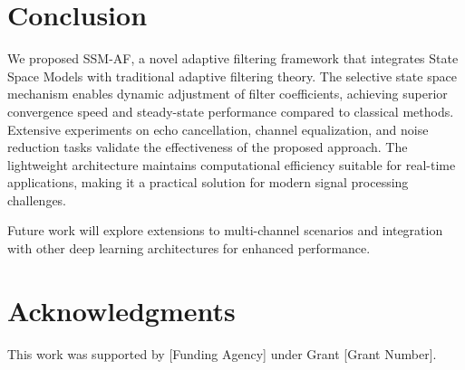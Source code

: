 \documentclass[a4paper,fleqn]{cas-sc}
\begin{document}


\section{Conclusion}\label{sec:conclusion}

We proposed SSM-AF, a novel adaptive filtering framework that integrates State Space Models with traditional adaptive filtering theory. The selective state space mechanism enables dynamic adjustment of filter coefficients, achieving superior convergence speed and steady-state performance compared to classical methods. Extensive experiments on echo cancellation, channel equalization, and noise reduction tasks validate the effectiveness of the proposed approach. The lightweight architecture maintains computational efficiency suitable for real-time applications, making it a practical solution for modern signal processing challenges.

Future work will explore extensions to multi-channel scenarios and integration with other deep learning architectures for enhanced performance.


\section*{Acknowledgments}

This work was supported by [Funding Agency] under Grant [Grant Number].






\printcredits
\end{document}
